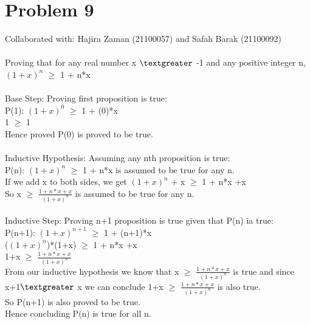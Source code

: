 \documentclass{article}
\begin{document}
\section{Problem 9}
Collaborated with:  Hajira Zaman (21100057) and Safah Barak (21100092)\\\\
Proving that for any real number x $\textgreater$ -1 and any positive integer n, $(1 + x)^{n}$ $\geq$ 1 + n*x \\\\
Base Step: Proving first proposition is true:\\
P(1): $(1 + x)^{0}$ $\geq$ 1 + (0)*x \\
1  $\geq$ 1  \\
Hence proved P(0) is proved to be true. \\\\
Inductive Hypothesis: Assuming any nth proposition is true:\\
P(n): $(1 + x)^{n}$ $\geq$ 1 + n*x is assumed to be true for any n.\\
If we add x to both sides, we get $(1 + x)^{n}$ + x $\geq$ 1 + n*x +x\\
So x $\geq$ $\frac{1 + n*x + x}{(1+x)^{n}}$ is assumed to be true for any n.\\\\
Inductive Step: Proving  n+1 proposition is true given that P(n) ia true:\\
P(n+1): $(1 + x)^{n+1}$ $\geq$ 1 + (n+1)*x\\
($(1 + x)^{n}$)*(1+x) $\geq$ 1 + n*x +x\\  
1+x $\geq$ $\frac{1 + n*x + x}{(1+x)^{n}}$ \\
From our inductive hypothesis we know that x $\geq$ $\frac{1 + n*x + x}{(1+x)^{n}}$ is true and since x+1$\textgreater$ x we can conclude 1+x $\geq$ $\frac{1 + n*x + x}{(1+x)^{n}}$ is also true. \\
So P(n+1) is also proved to be true.\\
Hence concluding P(n) is true for all n.\\
\end{document}
